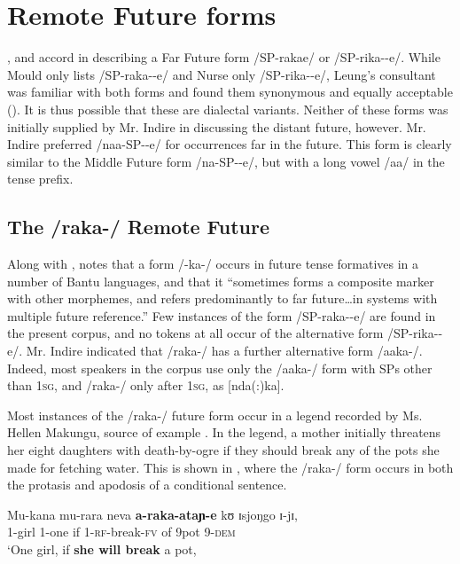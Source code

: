 \documentclass[output=paper]{langsci/langscibook}
\begin{document}
\section[Remote Future forms]{Remote Future forms} \label{sec:sarvasy:6}
\citet{Mould1981}, \citet{Leung1991} and \citet{Nurse2003} accord in describing a Far Future %
%
form /SP-raka{\longrule}e/ or /SP-rika-{\longrule}-e/. While Mould only lists /SP-raka-{\longrule}-e/ and Nurse only /SP-rika-{\longrule}-e/, Leung’s consultant was familiar with both forms and found them synonymous and equally acceptable (\citeyear[204, fn 10]{Leung1991}). It is thus possible that these are dialectal variants. Neither of these forms was initially supplied by Mr. Indire in discussing the distant future, however. Mr. Indire preferred /naa-SP-{\longrule}-e/ for occurrences far in the future. This form is clearly similar to the Middle Future form /na-SP-{\longrule}-e/, but with a long vowel /aa/ in the tense prefix. 

\subsection{The /raka-/ Remote Future}\label{sec:sarvasy:6.1}

Along with \citet{Botne1999}, \citet[85]{Nurse2008} notes that a form /-ka-/ occurs in future tense formatives in a number of Bantu languages, and that it “sometimes forms a composite marker with other morphemes, and refers predominantly to far future\ldots in systems with multiple future reference.” Few instances of the form /SP-raka-{\longrule}-e/ are found in the present corpus, and no tokens at all occur of the alternative form /SP-rika-{\longrule}-e/. Mr. Indire indicated that /raka-/ has a further alternative form /aaka-/. Indeed, most speakers in the corpus use only the /aaka-/ form with SPs other than \textsc{1sg}, and /raka-/ only after \textsc{1sg}, as [nda(:)ka].

Most instances of the /raka-/ future form occur in a legend recorded by Ms. Hellen Makungu, source of example . In the legend, a mother initially threatens her eight daughters with death-by-ogre if they should break any of the pots she made for fetching water. This is shown in , where the /raka-/ form occurs in both the protasis and apodosis of a conditional sentence. 

\ea\label{ex:sarvasy:14}
\gll Mu-kana   mu-rara   neva   \textbf{a-raka-ataɲ-e}   kʊ     ɪsjoŋgo   ɪ-jɪ,  \\
1-girl    1-one    if  1-\textsc{rf}-break-\textsc{fv}  of  9pot   9-\textsc{dem} \\
\glt ‘One girl, if \textbf{she will break} a pot,
\end{document}
